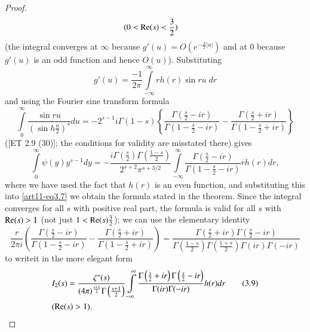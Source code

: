 \begin{proof}
\begin{align*}
& (0 <\operatorname{Re} (s) <\frac{3}{2})
\end{align*}
(the integral converges at $\infty$ because $g'(u) = O \left(e^{-\frac{A}{2} |u|} \right)$ and at 0 because $g'(u)$ is an odd function and hence $O(u)$). Substituting 
$$
g'(u) = \frac{-1}{2 \pi} \int\limits^\infty_{-\infty} rh (r) \sin ru \; dr
$$
and using the Fourier sine transform formula
$$
\int\limits^\infty_{0} \frac{\sin r u}{\left(\sin h \frac{u}{2} \right)^s}  du = - 2^{s-1} i \Gamma (1-s)
\left\{\frac{\Gamma \left(\frac{s}{2} - ir \right)}{\Gamma \left(1-\frac{s}{2}  - ir \right)} - \frac{\Gamma \left(\frac{s}{2} + ir \right)}{\Gamma \left(1-\frac{s}{2} + ir \right)} \right\}
$$
([ET 2.9 (30)]; the conditions for validity are misstated there) gives
$$
\int\limits^\infty_0 \psi (y) y^{s-1} dy  = - \frac{i\Gamma \left(\frac{s}{2} \right) \Gamma \left(\frac{1-s}{2} \right)}{2^{s+2} \pi^{s+3/2}} \int\limits^\infty_{-\infty} \frac{\Gamma \left(\frac{s}{2} -ir \right)}{\Gamma \left(1-\frac{s}{2} -ir \right)} r h (r) dr, 
$$
where we have used the fact that $h(r)$ is an even function, and substituting this into \eqref{art11-eq3.7} we obtain the formula stated in the theorem. Since the integral converges for all $s$ with positive real part, the formula is valid for all $s$ with $\operatorname{Re} (s) >1$ (not just $1 < \operatorname{Re} (s) \frac{3}{2}$); we can use the elementary identity
$$
\frac{r}{2 \pi i} 
\left(\frac{\Gamma \left(\frac{s}{2} - ir \right)}{\Gamma \left(1-\frac{s}{2} - ir \right)} - \frac{\Gamma \left(\frac{s}{2} + ir \right)}{\Gamma \left(1-\frac{s}{2} + ir \right)} \right) = \frac{\Gamma \left(\frac{s}{2} + ir \right) \Gamma \left(\frac{s}{2} - ir \right)}{\Gamma \left(\frac{1-s}{2} \right) \Gamma \left(\frac{1+s}{2} \right) \Gamma (ir) \Gamma (-ir)}
$$
to write\pageoriginale it in the more elegant form 
\begin{align*}
&I_2 (s) = \frac{\zeta^\ast (s)}{(4 \pi)^{\frac{s+1}{2}} \Gamma \left(\frac{s+1}{2} \right) }  \int\limits^\infty_{-\infty} \frac{\Gamma \left(\frac{s}{2} + ir \right) \Gamma \left(\frac{s}{2} - ir \right)}{\Gamma (ir) \Gamma (-ir)} h (r) dr\tag{3.9}\label{art11-eq3.9} \\
& (\operatorname{Re} (s) >1).
\end{align*}


\end{proof}
